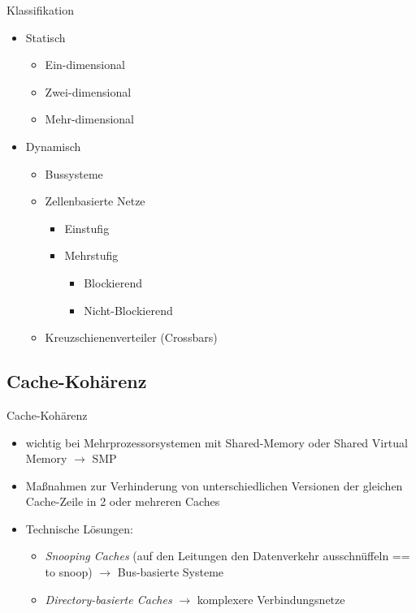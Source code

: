 \begin{defi}[Verbindungsnetzwerk]{Klassifikation}
    \begin{itemize}
        \item Statisch
              \begin{itemize}
                  \item Ein-dimensional
                  \item Zwei-dimensional
                  \item Mehr-dimensional
              \end{itemize}
        \item Dynamisch
              \begin{itemize}
                  \item Bussysteme
                  \item Zellenbasierte Netze
                        \begin{itemize}
                            \item Einstufig
                            \item Mehrstufig
                                  \begin{itemize}
                                      \item Blockierend
                                      \item Nicht-Blockierend
                                  \end{itemize}
                        \end{itemize}
                  \item Kreuzschienenverteiler (Crossbars)
              \end{itemize}
    \end{itemize}
\end{defi}

\subsection{Cache-Kohärenz}

\begin{defi}{Cache-Kohärenz}
    \begin{itemize}
        \item wichtig bei Mehrprozessorsystemen mit Shared-Memory oder Shared Virtual Memory $\to$ SMP
        \item Maßnahmen zur Verhinderung von unterschiedlichen Versionen der gleichen Cache-Zeile in 2 oder mehreren Caches
        \item Technische Lösungen:
              \begin{itemize}
                  \item \emph{Snooping Caches} (auf den Leitungen den Datenverkehr ausschnüffeln == to snoop) $\to$ Bus-basierte Systeme
                  \item \emph{Directory-basierte Caches} $\to$ komplexere Verbindungsnetze
              \end{itemize}
    \end{itemize}
\end{defi}

